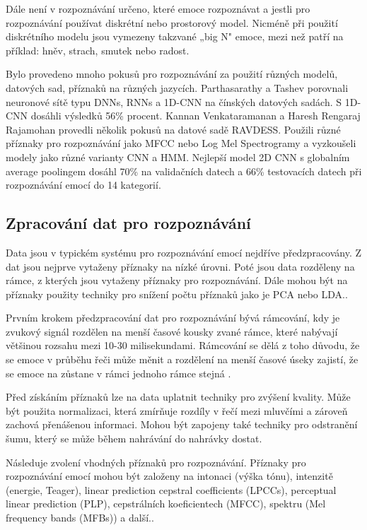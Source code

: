 \documentclass[FM,BP]{tulthesis}
\begin{document}
Dále není v rozpoznávání určeno, které emoce rozpoznávat a jestli pro rozpoznávání používat diskrétní nebo prostorový model. Nicméně při použití diskrétního modelu jsou vymezeny takzvané „big N" emoce, mezi než patří na příklad: hněv, strach, smutek nebo radost\cite{konar_chakraborty_2015}.

Bylo provedeno mnoho pokusů pro rozpoznávání za použití různých modelů, datových sad, příznaků na různých jazycích. Parthasarathy a
Tashev porovnali neuronové sítě typu DNNs, RNNs a 1D-CNN na čínských datových sadách. S 1D-CNN dosáhli výsledků 56\% procent. Kannan Venkataramanan a Haresh Rengaraj Rajamohan provedli několik pokusů na datové sadě RAVDESS. Použili různé příznaky pro rozpoznávání jako MFCC nebo Log Mel Spectrogramy a vyzkoušeli modely jako různé varianty CNN a HMM. Nejlepší model 2D CNN s globalním average poolingem dosáhl 70\% na validačních datech a 66\% testovacích datech při rozpoznávání emocí do 14 kategorií\cite{DBLP:journals/corr/abs-1912-10458}.

\subsection{Zpracování dat pro rozpoznávání}
Data jsou v typickém systému pro rozpoznávání emocí nejdříve předzpracovány. Z dat jsou nejprve vytaženy příznaky na nízké úrovni. Poté jsou data rozděleny na rámce, z kterých jsou vytaženy příznaky pro rozpoznávání. Dále mohou být na příznaky použity techniky pro snížení počtu příznaků jako je PCA nebo LDA.\cite{konar_chakraborty_2015}.

Prvním krokem předzpracování dat pro rozpoznávání bývá rámcování, kdy je zvukový signál rozdělen na menší časové kousky zvané rámce, které nabývají většinou rozsahu mezi 10-30 milisekundami. Rámcování se dělá z toho důvodu, že se emoce v průběhu řeči může měnit a rozdělení na menší časové úseky zajistí, že se emoce na zůstane v rámci jednoho rámce stejná \cite{konar_chakraborty_2015}.

Před získáním příznaků lze na data uplatnit techniky pro zvýšení kvality. Může být použita normalizaci, která zmírňuje rozdíly v řečí mezi mluvčími a zároveň zachová přenášenou informaci. Mohou být zapojeny také techniky pro odstranění šumu, který se může během nahrávání do nahrávky dostat\cite{DBLP:journals/speech/AkcayO20}.

Následuje zvolení vhodných příznaků pro rozpoznávání. Příznaky pro rozpoznávání emocí mohou být založeny na intonaci (výška tónu), intenzitě (energie, Teager), linear prediction cepstral coefficients (LPCCs), perceptual linear prediction (PLP), cepstrálních koeficientech (MFCC), spektru (Mel frequency bands (MFBs)) a další.\cite{konar_chakraborty_2015}.
\end{document}
